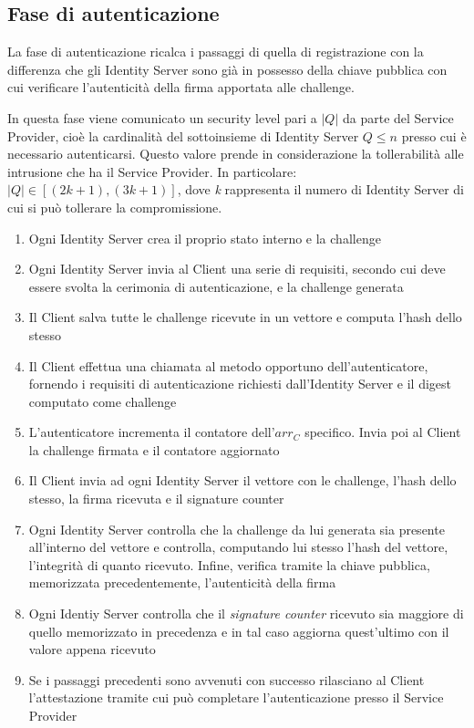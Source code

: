 \subsection{Fase di autenticazione}
\label{autenticazione}

La fase di autenticazione ricalca i passaggi di quella di registrazione con la differenza che gli Identity Server sono già in possesso della chiave pubblica con cui verificare l'autenticità della firma apportata alle challenge. 

In questa fase viene comunicato un security level pari a ${|Q|}$ da parte del Service Provider, cioè la cardinalità del sottoinsieme di Identity Server ${Q\leq n}$ presso cui è necessario autenticarsi. Questo valore prende in considerazione la tollerabilità alle intrusione che ha il Service Provider. In particolare: ${|Q| \in [(2k+1), (3k+1)] }$, dove \emph{k} rappresenta il numero di Identity Server di cui si può tollerare la compromissione. 

\begin{enumerate}
	\item Ogni Identity Server crea il proprio stato interno e la challenge
	\item Ogni Identity Server invia al Client una serie di requisiti, secondo cui deve essere svolta la cerimonia di autenticazione, e la challenge generata
	\item Il Client salva tutte le challenge ricevute in un vettore e computa l'hash dello stesso
	\item Il Client effettua una chiamata al metodo opportuno dell'autenticatore, fornendo i requisiti di autenticazione richiesti dall'Identity Server e il digest computato come challenge
	\item L'autenticatore incrementa il contatore dell'${arr_C}$ specifico. Invia poi al Client la challenge firmata e il contatore aggiornato
	\item Il Client invia ad ogni Identity Server il vettore con le challenge, l'hash dello stesso, la firma ricevuta e il signature counter
	\item Ogni Identity Server controlla che la challenge da lui generata sia presente all'interno del vettore e controlla, computando lui stesso l'hash del vettore, l'integrità di quanto ricevuto. Infine, verifica tramite la chiave pubblica, memorizzata precedentemente, l'autenticità della firma
	\item Ogni Identiy Server controlla che il \emph{signature counter} ricevuto sia maggiore di quello memorizzato in precedenza e in tal caso aggiorna quest'ultimo con il valore appena ricevuto
	\item Se i passaggi precedenti sono avvenuti con successo rilasciano al Client l'attestazione tramite cui può completare l'autenticazione presso il Service Provider
\end{enumerate}